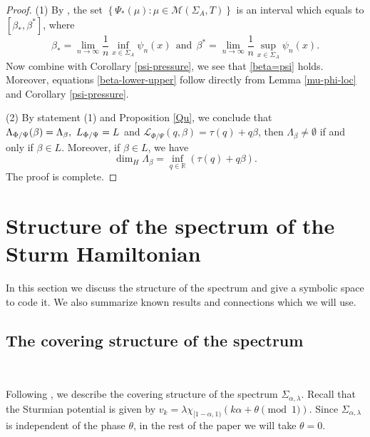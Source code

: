 \documentclass[reqno,11pt,graphicx,]{amsart}
\numberwithin{equation}{section}
\theoremstyle{plain}
\newcommand{\3}{\mathbf{3}}
\newcommand{\mw}{x}
\begin{document}
	\begin{proof}
		(1) By \cite[Lemmas A.3(1) and A.4(iii)]{FH2010}, the set $\left\{\Psi_*(\mu):\mu\in\mathcal{M}%
		(\Sigma_A,T)\right\}$ is an interval which equals to $[\beta_*,\beta^*]$, where 
		\begin{equation*}
			\beta_*=\lim\limits_{n\to \infty}\dfrac{1}{n}%
			\inf\limits_{\mw\in\Sigma_A}\psi_{n}(\mw) \ \ \text{and} \ \
			\beta^*=\lim\limits_{n\to \infty}\dfrac{1}{n}%
			\sup\limits_{\mw\in\Sigma_A}\psi_{n}(\mw).
		\end{equation*}
		Now combine with Corollary \ref{psi-pressure}, we see that \eqref{beta=psi} holds. Moreover, equations \eqref{beta-lower-upper} follow directly from Lemma \ref{mu-phi-loc} and Corollary \ref{psi-pressure}.
		
		(2) By statement (1) and
		Proposition \ref{Qu}, we conclude that $\Lambda_{\Phi/\Psi}(\beta)=\Lambda_{%
			\beta},\ L_{\Phi/\Psi}=L$ and $\mathcal{L}_{\Phi/\Psi}(q,\beta)=\tau(q)+q\beta$, then
		$\Lambda_{\beta}\neq\emptyset$ if and only if $\beta\in L$. Moreover, if $%
		\beta\in L$, we have 
		\begin{equation*}
			\dim_H\Lambda_{\beta}=\inf_{q\in{\mathbb{R}}}(\tau(q)+q\beta).
		\end{equation*}
		The proof is complete.
	\end{proof}
	
	\section{Structure of the spectrum of the Sturm Hamiltonian}\label{sec-spectrum}
	
	In this section we discuss the structure of the spectrum and give a symbolic space to code it. We also summarize known results and connections which we will use.
	\subsection{The covering structure of the spectrum}\label{sec-spectrum-1}\
	
	Following \cite{LW2004,Ra1997}, we describe the covering structure of the spectrum $\Sigma_{\alpha,\lambda}$. Recall that the Sturmian potential is given by $v_k=\lambda\chi_{[1-%
		\alpha,1)}(k\alpha+\theta\pmod 1). $ Since $\Sigma_{\alpha,\lambda}$ is
	independent of the phase $\theta$, in the rest of the paper we will take $%
	\theta=0$. 
	
\end{document}
